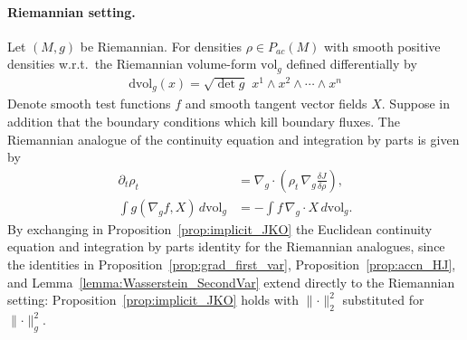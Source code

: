 \documentclass[reqno,11pt,letterpaper]{amsart}
\theoremstyle{plain}
\theoremstyle{definition}
\theoremstyle{remark}
\begin{document}

\paragraph{Riemannian setting.}
Let $(M,g)$ be Riemannian.
For densities $\rho \in{P}_{ac}(M)$ with smooth positive densities w.r.t.\ the Riemannian volume-form $\mathrm{vol}_g$ defined differentially by
\begin{align*}
    \mathrm{d}\mathrm{vol}_g (x) = \sqrt{\det g} \,\,x^{1} \land x^{2} \land \cdots  \land x^{n}
\end{align*}
Denote smooth test functions $f$ and smooth tangent vector fields $X$. Suppose in addition that the boundary conditions which kill boundary fluxes. The Riemannian analogue of the continuity equation and integration by parts is given by
\begin{align*}
    \partial_t \rho_t &= \nabla_g \cdot\!\left( \rho_t \, \nabla_g \frac{\delta J}{\delta \rho} \right), \\
    \displaystyle \int g(\nabla_g f, X)\,d\mathrm{vol}_g &= -\int f\, \nabla_g\!\cdot X\, d\mathrm{vol}_g.
\end{align*}
By exchanging in Proposition~\ref{prop:implicit_JKO} the Euclidean continuity equation and integration by parts identity for the Riemannian analogues, since the identities in Proposition~\ref{prop:grad_first_var}, Proposition~\ref{prop:accn_HJ}, and
Lemma~\ref{lemma:Wasserstein_SecondVar} extend directly to the Riemannian setting: Proposition~\ref{prop:implicit_JKO} holds with $\lVert \cdot \rVert_{2}^{2}$ substituted for $\lVert \cdot \rVert_{g}^{2}$.
\end{document}
